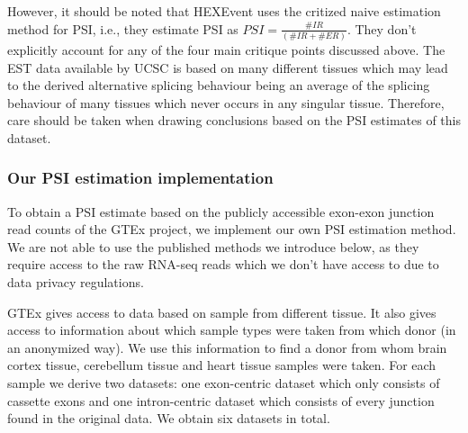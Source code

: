 However, it should be noted that HEXEvent uses the critized naive estimation method for PSI, i.e., they estimate PSI as $PSI = \frac{\#IR}{(\#IR+\#ER)}$. They don't explicitly account for any of the four main critique points discussed above. The EST data available by UCSC is based on many different tissues which may lead to the derived alternative splicing behaviour being an average of the splicing behaviour of many tissues which never occurs in any singular tissue. %
Therefore, care should be taken when drawing conclusions based on the PSI estimates of this dataset. 

\subsubsection{Our PSI estimation implementation} \label{subsubsec:implementedpsiestimation}
To obtain a PSI estimate based on the publicly accessible exon-exon junction read counts of the GTEx project, we implement our own PSI estimation method. We are not able to use the published methods we introduce below, as they require access to the raw RNA-seq reads which we don't have access to due to data privacy regulations.

GTEx gives access to data based on sample from different tissue. It also gives access to information about which sample types were taken from which donor (in an anonymized way). We use this information to find a donor from whom brain cortex tissue, cerebellum tissue and heart tissue samples were taken. For each sample we derive two datasets: one exon-centric dataset which only consists of cassette exons and one intron-centric dataset which consists of every junction found in the original data.
We obtain six datasets in total.

